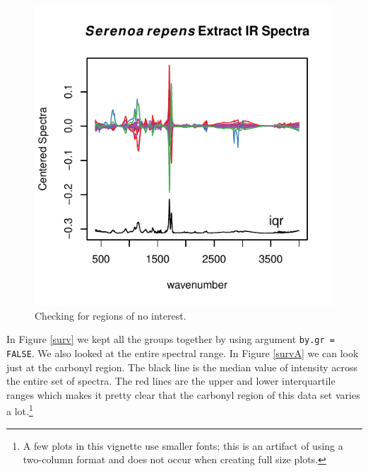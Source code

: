 \documentclass[letter,10pt,twocolumn,twoside,printwatermark=false]{pinp}
\begin{document}
\begin{figure}

{\centering \includegraphics{ChemoSpec2_files/figure-latex/Chunk14d-1} 

}

\caption{\label{surv2}Checking for regions of no interest.}\label{fig:Chunk14d}
\end{figure}

In Figure \ref{surv} we kept all the groups together by using argument
\texttt{by.gr = FALSE}. We also looked at the entire spectral range. In
Figure \ref{survA} we can look just at the carbonyl region. The black
line is the median value of intensity across the entire set of spectra.
The red lines are the upper and lower interquartile ranges which makes
it pretty clear that the carbonyl region of this data set varies a
lot.\footnote{A few plots in this vignette use smaller fonts; this is an artifact of using a two-column format and does not occur when creating full size plots.}

\begin{Shaded}
\begin{Highlighting}[]
   \NormalTok{,}
   \NormalTok{,}
   \NormalTok{,}
   \NormalTok{(}\NormalTok{, }\NormalTok{))}
\end{Highlighting}
\end{Shaded}
\end{document}
